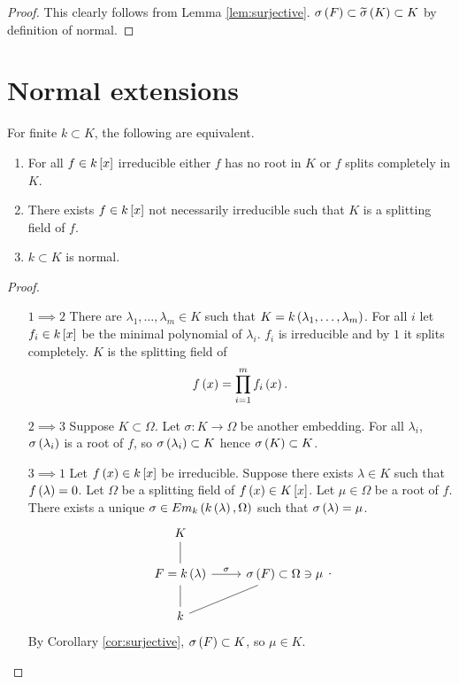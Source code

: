 \begin{proof}
This clearly follows from Lemma \ref{lem:surjective}. $ \sigma\rb{F} \subset \widetilde{\sigma}\rb{K} \subset K $ by definition of normal.
\end{proof}

\pagebreak

\section{Normal extensions}

\begin{theorem}
For finite $ k \subset K $, the following are equivalent.
\begin{enumerate}
\item For all $ f \in k\sb{x} $ irreducible either $ f $ has no root in $ K $ or $ f $ splits completely in $ K $.
\item There exists $ f \in k\sb{x} $ not necessarily irreducible such that $ K $ is a splitting field of $ f $.
\item $ k \subset K $ is normal.
\end{enumerate}
\end{theorem}

\begin{proof}
\hfill
\begin{itemize}[leftmargin=0.5in]
\item[$ 1 \implies 2 $] There are $ \lambda_1, \dots, \lambda_m \in K $ such that $ K = k\rb{\lambda_1, \dots, \lambda_m} $. For all $ i $ let $ f_i \in k\sb{x} $ be the minimal polynomial of $ \lambda_i $. $ f_i $ is irreducible and by $ 1 $ it splits completely. $ K $ is the splitting field of
$$ f\rb{x} = \prod_{i = 1}^m f_i\rb{x}. $$
\item[$ 2 \implies 3 $] Suppose $ K \subset \Omega $. Let $ \sigma : K \to \Omega $ be another embedding. For all $ \lambda_i $, $ \sigma\rb{\lambda_i} $ is a root of $ f $, so $ \sigma\rb{\lambda_i} \subset K $ hence $ \sigma\rb{K} \subset K $.
\item[$ 3 \implies 1 $] Let $ f\rb{x} \in k\sb{x} $ be irreducible. Suppose there exists $ \lambda \in K $ such that $ f\rb{\lambda} = 0 $. Let $ \Omega $ be a splitting field of $ f\rb{x} \in K\sb{x} $. Let $ \mu \in \Omega $ be a root of $ f $. There exists a unique $ \sigma \in Em_k\rb{k\rb{\lambda}, \Omega} $ such that $ \sigma\rb{\lambda} = \mu $.
$$
\begin{tikzcd}
K & \\
F = k\rb{\lambda} \arrow[dash]{u} \arrow{r}{\sigma} & \sigma\rb{F} \subset \Omega \ni \mu \\
k \arrow[dash]{u} \arrow[dash]{ur} &
\end{tikzcd}.
$$
By Corollary \ref{cor:surjective}, $ \sigma\rb{F} \subset K $, so $ \mu \in K $.
\end{itemize}
\end{proof}

